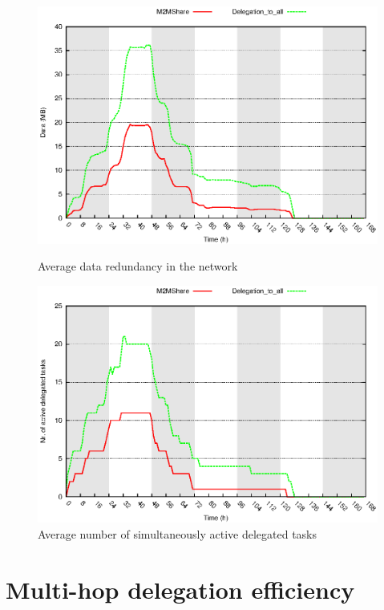 \begin{figure}[htbp]
\begin{minipage}[b]{1\linewidth}
\centering
\includegraphics{grafici/ridondanza.eps}
\caption{Average data redundancy in the network}
\label{graficoRidondanzaData}
\end{minipage}
\hspace{0.5cm}
\begin{minipage}[b]{1\linewidth}
\centering
\includegraphics{grafici/delegheAttive.eps}
\caption{Average number of simultaneously active delegated tasks}
\label{graficoDelegheAttive}
\end{minipage}
\end{figure}


\newpage
\section{Multi-hop delegation efficiency}

